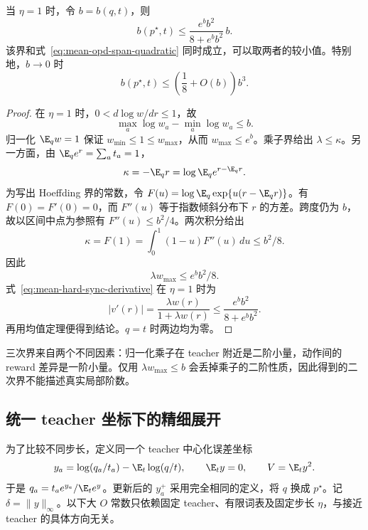 \begin{proposition}
\label{prop:mean-hard-sync-cubic-span}
当 $\eta=1$ 时，令 $b=b(q,t)$，则
\begin{equation}
 b(p^\star,t)
 \le\frac{e^b b^2}{8+e^b b^2}\,b.
 \label{eq:mean-hard-sync-cubic-span}
\end{equation}
该界和式~\eqref{eq:mean-opd-span-quadratic} 同时成立，可以取两者的较小值。特别地，$b\to0$ 时
\[
 b(p^\star,t)\le\left(\frac18+O(b)\right)b^3.
\]
\end{proposition}

\begin{proof}
在 $\eta=1$ 时，$0<d\log w/dr\le1$，故
\[
 \max_a\log w_a-\min_a\log w_a\le b.
\]
归一化 $\E_qw=1$ 保证 $w_{\min}\le1\le w_{\max}$，从而 $w_{\max}\le e^b$。乘子界给出 $\lambda\le\kappa$。另一方面，由 $\E_qe^r=\sum_at_a=1$，
\[
 \kappa=-\E_qr
 =\log\E_qe^{r-\E_qr}.
\]
为写出 Hoeffding 界的常数，令 $F(u)=\log\E_q\exp\{u(r-\E_qr)\}$。有 $F(0)=F'(0)=0$，而 $F''(u)$ 等于指数倾斜分布下 $r$ 的方差。跨度仍为 $b$，故以区间中点为参照有 $F''(u)\le b^2/4$。两次积分给出
\[
 \kappa=F(1)=\int_0^1(1-u)F''(u)\,du\le b^2/8.
\]
因此
\[
 \lambda w_{\max}\le e^b b^2/8.
\]
式~\eqref{eq:mean-hard-sync-derivative} 在 $\eta=1$ 时为
\[
 |v'(r)|=\frac{\lambda w(r)}{1+\lambda w(r)}
 \le\frac{e^b b^2}{8+e^b b^2}.
\]
再用均值定理便得到结论。$q=t$ 时两边均为零。
\end{proof}

三次界来自两个不同因素：归一化乘子在 teacher 附近是二阶小量，动作间的 reward 差异是一阶小量。仅用 $\lambda w_{\max}\le b$ 会丢掉乘子的二阶性质，因此得到的二次界不能描述真实局部阶数。

\subsection{统一 teacher 坐标下的精细展开}
\label{sec:mean-hard-sync-local-expansion}

为了比较不同步长，定义同一个 teacher 中心化误差坐标
\begin{equation}
 y_a=\log(q_a/t_a)-\E_t\log(q/t),
 \qquad \E_ty=0,\qquad V=\E_ty^2.
 \label{eq:mean-hard-sync-centered-coordinate}
\end{equation}
于是 $q_a=t_ae^{y_a}/\E_te^y$。更新后的 $y_a^+$ 采用完全相同的定义，将 $q$ 换成 $p^\star$。记 $\delta=\|y\|_\infty$。以下大 $O$ 常数只依赖固定 teacher、有限词表及固定步长 $\eta$，与接近 teacher 的具体方向无关。


